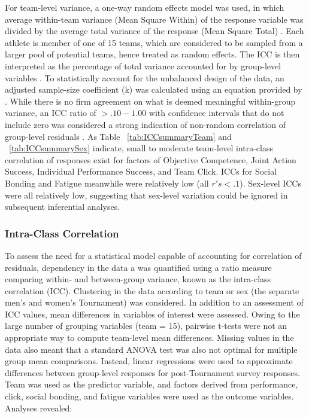 {For team-level variance, a one-way random effects model was used, in which average within-team variance (Mean Square Within) of the response variable was divided by the average total variance of the response (Mean Square Total) \citep{Field2005a}.  Each athlete is member of one of 15 teams, which are considered to be sampled from a larger pool of potential teams, hence treated as random effects. The ICC is then interpreted as the percentage of total variance accounted for by group-level variables \citep{Wolak2012}.
To statistically account for the unbalanced design of the data, an adjusted sample-size coefficient (k) was calculated using an equation provided by \citep{Lessells1987}.  While there is no firm agreement on what is deemed meaningful within-group variance, an ICC ratio of $>.10-1.00$ with confidence intervals that do not include zero was considered a strong indication of non-random correlation of group-level residuals \citep{Bailey2011}. As Table ~\ref{tab:ICCsummaryTeam} and ~\ref{tab:ICCsummarySex} indicate, small to moderate team-level intra-class correlation of responses exist for factors of Objective Competence, Joint Action Success, Individual Performance Success, and Team Click. ICCs for Social Bonding and Fatigue meanwhile were relatively low (all $r's <.1$). Sex-level ICCs were all relatively low, suggesting that sex-level variation could be ignored in subsequent inferential analyses.\\





\subsubsection{Intra-Class Correlation}
To assess the need for a statistical model capable of accounting for correlation of residuals, dependency in the data a was quantified using a ratio measure comparing within- and between-group variance, known as the intra-class correlation (ICC). Clustering in the data according to team or sex (the separate men's and women's Tournament) was considered.  In addition to an assessment of ICC values, mean differences in variables of interest were assessed. Owing to the large number of grouping variables (team = 15), pairwise t-tests were not an appropriate way to compute team-level mean differences. Missing values in the data also meant that a standard ANOVA test was also not optimal for multiple group mean comparisons.  Instead, linear regressions were used to approximate differences between group-level responses for post-Tournament survey responses.  Team was used as the predictor variable, and factors derived from performance, click, social bonding, and fatigue variables were used as the outcome variables.  Analyses revealed:

}
